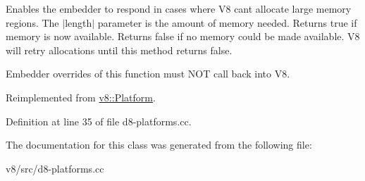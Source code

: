 Enables the embedder to respond in cases where V8 can\textquotesingle{}t allocate large memory regions. The $\vert$length$\vert$ parameter is the amount of memory needed. Returns true if memory is now available. Returns false if no memory could be made available. V8 will retry allocations until this method returns false.

Embedder overrides of this function must N\+OT call back into V8. 

Reimplemented from \mbox{\hyperlink{classv8_1_1Platform_a0de4b8a7bb8865ce65beb5afbaabe4cc}{v8\+::\+Platform}}.



Definition at line 35 of file d8-\/platforms.\+cc.



The documentation for this class was generated from the following file\+:\begin{DoxyCompactItemize}
\item 
v8/src/d8-\/platforms.\+cc\end{DoxyCompactItemize}
